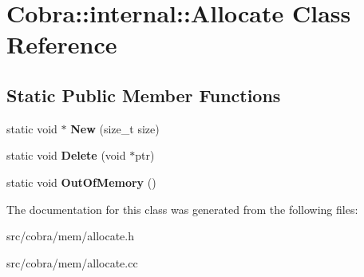\hypertarget{class_cobra_1_1internal_1_1_allocate}{\section{Cobra\+:\+:internal\+:\+:Allocate Class Reference}
\label{class_cobra_1_1internal_1_1_allocate}
}
\subsection*{Static Public Member Functions}
\begin{DoxyCompactItemize}
\item 
\hypertarget{class_cobra_1_1internal_1_1_allocate_a6b49adcfff6d42b358c6ca4b6656e30d}{static void $\ast$ {\bfseries New} (size\+\_\+t size)}\label{class_cobra_1_1internal_1_1_allocate_a6b49adcfff6d42b358c6ca4b6656e30d}

\item 
\hypertarget{class_cobra_1_1internal_1_1_allocate_aa249a117dc719e7ef60835c186314d79}{static void {\bfseries Delete} (void $\ast$ptr)}\label{class_cobra_1_1internal_1_1_allocate_aa249a117dc719e7ef60835c186314d79}

\item 
\hypertarget{class_cobra_1_1internal_1_1_allocate_a0328c6b5a3d079f70e6f475a3ec85534}{static void {\bfseries Out\+Of\+Memory} ()}\label{class_cobra_1_1internal_1_1_allocate_a0328c6b5a3d079f70e6f475a3ec85534}

\end{DoxyCompactItemize}


The documentation for this class was generated from the following files\+:\begin{DoxyCompactItemize}
\item 
src/cobra/mem/allocate.\+h\item 
src/cobra/mem/allocate.\+cc\end{DoxyCompactItemize}
